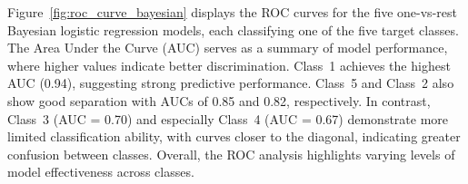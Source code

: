 Figure~\ref{fig:roc_curve_bayesian} displays the ROC curves for the five one-vs-rest Bayesian logistic regression models, each classifying one of the five target classes. 
The Area Under the Curve (AUC) serves as a summary of model performance, where higher values indicate better discrimination. Class~1 achieves the highest AUC (0.94),
 suggesting strong predictive performance. 
Class~5 and Class~2 also show good separation with AUCs of 0.85 and 0.82, respectively. In contrast, Class~3 (AUC = 0.70) and especially Class~4 (AUC = 0.67) demonstrate more 
limited classification ability, with curves closer to the diagonal, indicating greater confusion between classes. Overall, the ROC analysis highlights varying levels of model effectiveness across classes.